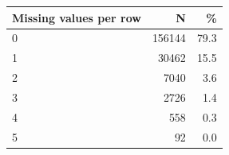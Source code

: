 \begin{threeparttable}


\begin{tabular}{@{}lrr@{}}


\toprule


\textbf{Missing values per row} & \textbf{N} & \textbf{\%} \\


\midrule


\midrule
0           &      156144&        79.3\\
1           &       30462&        15.5\\
2           &        7040&         3.6\\
3           &        2726&         1.4\\
4           &         558&         0.3\\
5           &          92&         0.0\\
\bottomrule


\end{tabular}


\end{threeparttable}
